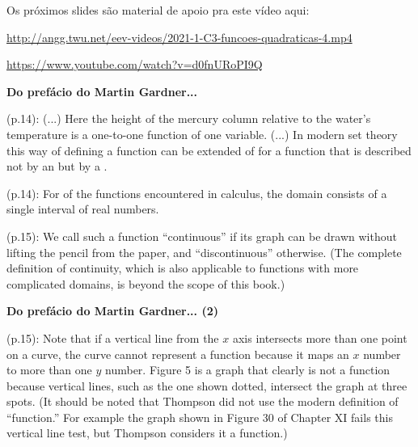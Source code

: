 \documentclass[oneside,12pt]{article}
\begin{document}
\newpage

Os próximos slides são material de apoio pra este vídeo aqui:

\ssk

{\footnotesize

\url{http://angg.twu.net/eev-videos/2021-1-C3-funcoes-quadraticas-4.mp4}

\url{https://www.youtube.com/watch?v=d0fnURoPI9Q}

}


\newpage


{\bf Do prefácio do Martin Gardner...}

\ssk

(p.14): (...) Here the height of the mercury column relative to the
water's temperature is a one-to-one function of one variable. (...) In
modern set theory this way of defining a function can be extended
 of  for a
function that is described not by an  but by a
.


\msk

(p.14): For  of the functions encountered in calculus,
the domain consists of a single interval of real numbers.

\msk

(p.15): We call such a function ``continuous'' if its graph can be
drawn without lifting the pencil from the paper, and ``discontinuous''
otherwise. (The complete definition of continuity, which is also
applicable to functions with more complicated domains, is beyond the
scope of this book.)

\newpage


{\bf Do prefácio do Martin Gardner... (2)}

\ssk

(p.15): Note that if a vertical line from the $x$ axis intersects more
than one point on a curve, the curve cannot represent a function
because it maps an $x$ number to more than one $y$ number. Figure 5 is
a graph that clearly is not a function because vertical lines, such as
the one shown dotted, intersect the graph at three spots. (It should
be noted that Thompson did not use the modern definition of
``function.'' For example the graph shown in Figure 30 of Chapter XI
fails this vertical line test, but Thompson considers it a function.)
\end{document}
